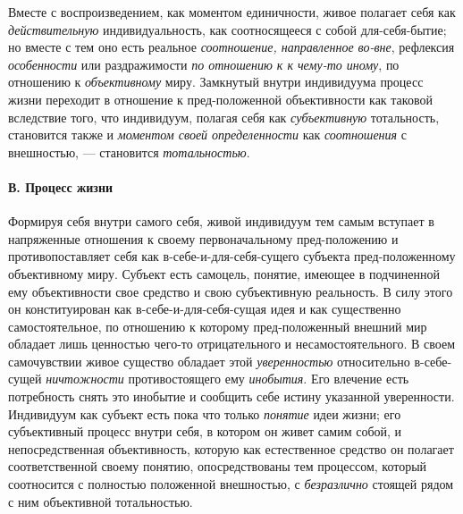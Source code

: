 \documentclass[twoside]{article}
\begin{document}
{{{Вместе с воспроизведением, как моментом единичности, живое
полагает себя как {\em действительную}
индивидуальность, как соотносящееся с собой для-себя-бытие;
но вместе с тем оно есть реальное
{\em соотношение, направленное во-вне},
рефлексия
{\em особенности} или
раздражимости {\em по отношению к
к чему-то иному}, по отношению к
{\em объективному} миру.
Замкнутый внутри индивидуума процесс жизни переходит в отношение к
пред-положенной объективности как таковой вследствие того, что
индивидуум, полагая себя как
{\em субъективную}
тотальность, становится также и
{\em моментом своей определенности}
как {\em соотношения}
с внешностью, — становится
{\em тотальностью}.

\paragraph[В. Процесс жизни]{В. Процесс жизни}
Формируя себя внутри самого себя, живой индивидуум тем самым
вступает в напряженные отношения к своему первоначальному пред-положению и
противопоставляет себя как в-себе-и-для-себя-сущего субъекта
пред-положенному объективному миру. Субъект есть самоцель, понятие, имеющее
в подчиненной ему объективности свое средство и свою субъективную
реальность. В силу этого он конституирован как в-себе-и-для-себя-сущая идея
и как существенно самостоятельное, по отношению к которому пред-положенный
внешний мир обладает лишь ценностью чего-то отрицательного и
несамостоятельного. В своем самочувствии живое существо обладает этой
{\em уверенностью}
относительно в-себе-сущей
{\em ничтожности}
противостоящего ему
{\em инобытия}. Его
влечение есть потребность снять это инобытие и сообщить себе истину
указанной уверенности. Индивидуум как субъект есть пока что только
{\em понятие} идеи жизни;
его субъективный процесс внутри себя, в котором он живет самим собой, и
непосредственная объективность, которую как естественное средство он
полагает соответственной своему понятию, опосредствованы тем процессом,
который соотносится с полностью положенной внешностью, с
{\em безразлично} стоящей
рядом с ним объективной тотальностью.

}}}
\end{document}
